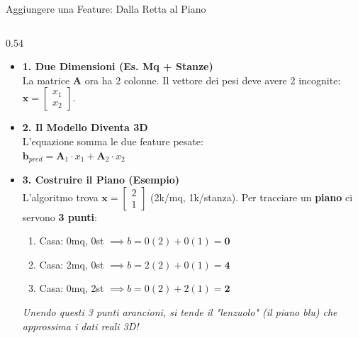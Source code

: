 \documentclass[aspectratio=169, 10pt]{beamer}
\begin{document}
\begin{frame}{Aggiungere una Feature: Dalla Retta al Piano}
    \begin{columns}[T,onlytextwidth]
        \setlength{\columnsep}{0.2cm}
        
        \begin{column}{0.54\textwidth}
            \vspace{0.1cm}
            \small
            \begin{itemize}
                \setlength\itemsep{0.6em}
                \item \textbf{1. Due Dimensioni (Es. Mq + Stanze)}\\
                La matrice $\mathbf{A}$ ora ha 2 colonne. Il vettore dei pesi deve avere 2 incognite: $\mathbf{x} = \begin{bmatrix} x_1 \\ x_2 \end{bmatrix}$.
                
                \item \textbf{2. Il Modello Diventa 3D}\\
                L'equazione somma le due feature pesate:\\
                $\mathbf{b}_{pred} = \mathbf{A}_1 \cdot x_1 + \mathbf{A}_2 \cdot x_2$
                
                \item \textbf{3. Costruire il Piano (Esempio)}\\
                L'algoritmo trova $\mathbf{x} = \begin{bmatrix} 2 \\ 1 \end{bmatrix}$ (2k/mq, 1k/stanza).
                Per tracciare un \textbf{piano} ci servono \textbf{3 punti}:
                \begin{enumerate}
                    \item Casa: 0mq, 0st $\implies b = 0(2) \!+\! 0(1) = \mathbf{0}$
                    \item Casa: 2mq, 0st $\implies b = 2(2) \!+\! 0(1) = \mathbf{4}$
                    \item Casa: 0mq, 2st $\implies b = 0(2) \!+\! 2(1) = \mathbf{2}$
                \end{enumerate}
                
                \vspace{0.1cm}
                \textit{\footnotesize Unendo questi 3 punti arancioni, si tende il "lenzuolo" (il piano blu) che approssima i dati reali 3D!}
            \end{itemize}
        \end{column}
        

\end{columns}
\end{frame}
\end{document}
